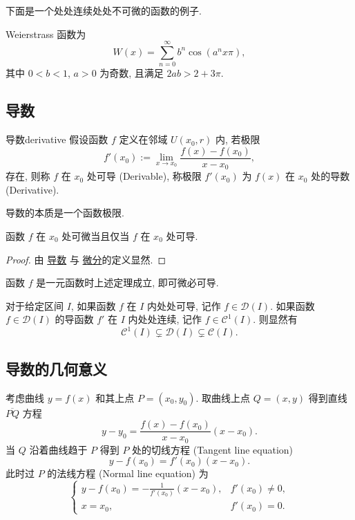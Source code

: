 \documentclass[cn,toc=twocol]{elegantbook}
\newcommand{\D}{\mathscr{D}}
\begin{document}
下面是一个处处连续处处不可微的函数的例子.

\begin{example}
	Weierstrass 函数为
	\[
		W(x) = \sum_{n = 0}^{\infty} b^n \cos(a^n x \pi),
	\]
	其中 $0 < b < 1$, $a > 0$ 为奇数, 且满足 $2ab > 2 + 3\pi$.
\end{example}



\subsection{导数}

\begin{definition}{导数}{derivative}
	假设函数 $f$ 定义在邻域 $U(x_0,r)$ 内, 若极限
	\[
		f'(x_0) := \lim_{x \to x_0} \frac{f(x) - f(x_0)}{x-x_0},
	\]
	存在, 则称 $f$ 在 $x_0$ 处可导 (Derivable), 称极限 $f'(x_0)$ 为 $f(x)$ 在 $x_0$ 处的导数 (Derivative).
\end{definition}

\begin{remark}
导数的本质是一个函数极限.	
\end{remark}


\begin{theorem}
	函数 $f$ 在 $x_0$ 处可微当且仅当 $f$ 在 $x_0$ 处可导.
\end{theorem}
\begin{proof}
	由 \hyperref[def:derivative]{导数} 与 \hyperref[def:differential]{微分}的定义显然.
\end{proof}
\begin{remark}
	函数 $f$ 是一元函数时上述定理成立, 即可微必可导.	
\end{remark}

对于给定区间 $I$, 如果函数 $f$ 在 $I$ 内处处可导, 记作 $f \in \D(I)$. 如果函数 $f \in \D(I)$ 的导函数 $f'$ 在 $I$ 内处处连续, 记作 $f \in \mathscr{C}^1(I)$. 则显然有
\[
	\mathscr{C}^1(I) \subsetneq \D(I) \subsetneq \mathscr{C}(I). 
\]

\subsection{导数的几何意义}

考虑曲线 $y = f(x)$ 和其上点 $P = (x_0,y_0)$. 取曲线上点 $Q = (x,y)$ 得到直线 $\overline{PQ}$ 方程
\[
	y - y_0 = \frac{f(x) - f(x_0)}{x - x_0} (x - x_0).
\]
当 $Q$ 沿着曲线趋于 $P$ 得到 $P$ 处的切线方程 (Tangent line equation)
\[
	y - f(x_0) = f'(x_0) (x - x_0).
\]
此时过 $P$ 的法线方程 (Normal line equation) 为
\[
\begin{cases}
	y - f(x_0) = - \frac{1}{f'(x_0)}(x - x_0), & f'(x_0) \neq 0,\\
	x = x_0, & f'(x_0) = 0.
\end{cases}
\]
\end{document}

